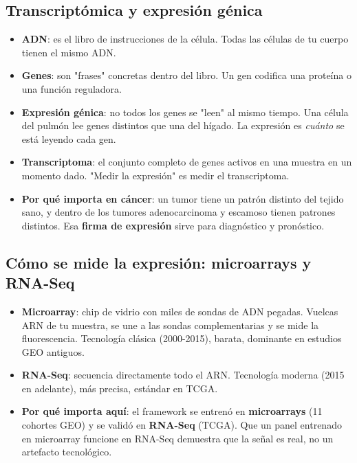 \documentclass[11pt, a4paper]{article}
\begin{document}
\subsection{Transcript\'omica y expresi\'on g\'enica}

\begin{itemize}[leftmargin=1.2em, itemsep=2pt]
  \item \textbf{ADN}: es el libro de instrucciones de la c\'elula. Todas las c\'elulas de tu cuerpo tienen el mismo ADN.
  \item \textbf{Genes}: son "frases" concretas dentro del libro. Un gen codifica una prote\'ina o una funci\'on reguladora.
  \item \textbf{Expresi\'on g\'enica}: no todos los genes se "leen" al mismo tiempo. Una c\'elula del pulm\'on lee genes distintos que una del h\'igado. La expresi\'on es \emph{cu\'anto} se est\'a leyendo cada gen.
  \item \textbf{Transcriptoma}: el conjunto completo de genes activos en una muestra en un momento dado. "Medir la expresi\'on" es medir el transcriptoma.
  \item \textbf{Por qu\'e importa en c\'ancer}: un tumor tiene un patr\'on distinto del tejido sano, y dentro de los tumores adenocarcinoma y escamoso tienen patrones distintos. Esa \textbf{firma de expresi\'on} sirve para diagn\'ostico y pron\'ostico.
\end{itemize}

\subsection{C\'omo se mide la expresi\'on: microarrays y RNA-Seq}

\begin{itemize}[leftmargin=1.2em, itemsep=2pt]
  \item \textbf{Microarray}: chip de vidrio con miles de sondas de ADN pegadas. Vuelcas ARN de tu muestra, se une a las sondas complementarias y se mide la fluorescencia. Tecnolog\'ia cl\'asica (2000-2015), barata, dominante en estudios GEO antiguos.
  \item \textbf{RNA-Seq}: secuencia directamente todo el ARN. Tecnolog\'ia moderna (2015 en adelante), m\'as precisa, est\'andar en TCGA.
  \item \textbf{Por qu\'e importa aqu\'i}: el framework se entren\'o en \textbf{microarrays} (11 cohortes GEO) y se valid\'o en \textbf{RNA-Seq} (TCGA). Que un panel entrenado en microarray funcione en RNA-Seq demuestra que la se\~nal es real, no un artefacto tecnol\'ogico.
\end{itemize}
\end{document}

